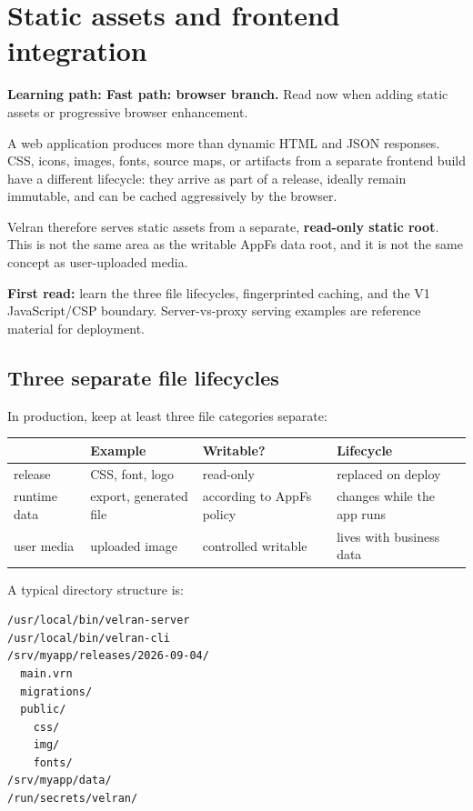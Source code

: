 \chapter{Static assets and frontend integration}

\noindent\textbf{Learning path: Fast path: browser branch.} Read now when adding static assets or progressive browser enhancement.\par\medskip

A web application produces more than dynamic HTML and JSON responses. CSS, icons, images, fonts, source maps, or artifacts from a separate frontend build have a different lifecycle: they arrive as part of a release, ideally remain immutable, and can be cached aggressively by the browser.

Velran therefore serves static assets from a separate, \textbf{read-only static root}. This is not the same area as the writable AppFs data root, and it is not the same concept as user-uploaded media.

\noindent\textbf{First read:} learn the three file lifecycles, fingerprinted caching, and the V1 JavaScript/CSP boundary. Server-vs-proxy serving examples are reference material for deployment.

\section{Three separate file lifecycles}

In production, keep at least three file categories separate:

\begin{center}
\begin{tabularx}{\textwidth}{@{}lYYY@{}}
\toprule
 & Example & Writable? & Lifecycle \\
\midrule
release & CSS, font, logo & read-only & replaced on deploy \\
runtime data & export, generated file & according to AppFs policy & changes while the app runs \\
user media & uploaded image & controlled writable & lives with business data \\
\bottomrule
\end{tabularx}
\end{center}

A typical directory structure is:

\begin{lstlisting}
/usr/local/bin/velran-server
/usr/local/bin/velran-cli
/srv/myapp/releases/2026-09-04/
  main.vrn
  migrations/
  public/
    css/
    img/
    fonts/
/srv/myapp/data/
/run/secrets/velran/
\end{lstlisting}

